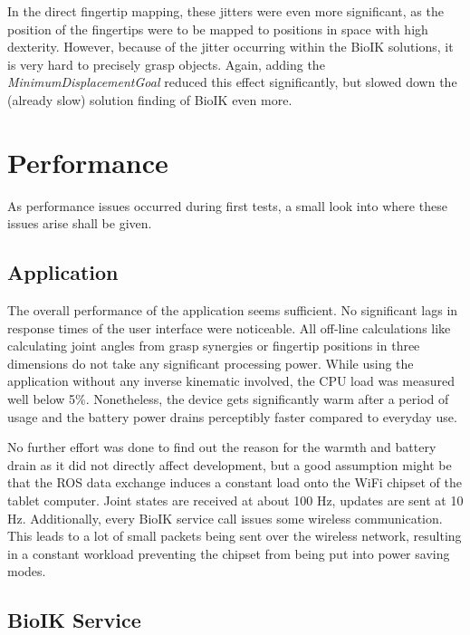 In the direct fingertip mapping, these jitters were even more significant, as the position of the fingertips were to be mapped to positions in space with high dexterity. However, because of the jitter occurring within the BioIK solutions, it is very hard to precisely grasp objects. Again, adding the \textit{MinimumDisplacementGoal} reduced this effect significantly, but slowed down the (already slow) solution finding of BioIK even more.

\section{Performance}

As performance issues occurred during first tests, a small look into where these issues arise shall be given.

\subsection{Application}

The overall performance of the application seems sufficient. No significant lags in response times of the user interface were noticeable. All off-line calculations like calculating joint angles from grasp synergies or fingertip positions in three dimensions do not take any significant processing power. While using the application without any inverse kinematic involved, the CPU load was measured well below 5\%. Nonetheless, the device gets significantly warm after a period of usage and the battery power drains perceptibly faster compared to everyday use. 

No further effort was done to find out the reason for the warmth and battery drain as it did not directly affect development, but a good assumption might be that the ROS data exchange induces a constant load onto the WiFi chipset of the tablet computer. Joint states are received at about 100 Hz, updates are sent at 10 Hz. Additionally, every BioIK service call issues some wireless communication. This leads to a lot of small packets being sent over the wireless network, resulting in a constant workload preventing the chipset from being put into power saving modes.

\subsection{BioIK Service}
\label{sec:eval:ikservice}

